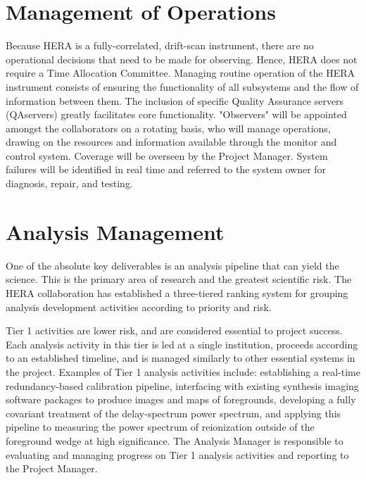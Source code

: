\documentclass[preprint]{aastex}
\begin{document}
\section{Management of Operations}
\label{sec:operations}

Because HERA is a fully-correlated, drift-scan instrument, there are no operational
decisions that need to be made for observing. Hence, HERA does not require a Time
Allocation Committee. Managing routine operation of the HERA instrument consists of
ensuring the functionality of all subsystems and the flow of information between
them. The inclusion of specific Quality Assurance servers (QAservers) greatly
facilitates core functionality. "Observers" will be appointed amongst the
collaborators on a rotating basis, who will manage operations, drawing on the
resources and information available through the monitor and control system. Coverage
will be overseen by the Project Manager. System failures will be identified in real
time and referred to the system owner for diagnosis, repair, and testing.


\section{Analysis Management}
\label{sec:analysis}

One of the absolute key deliverables is an analysis pipeline that can yield the science.  This is the primary area of
research and the greatest scientific risk.  The HERA collaboration has established
a three-tiered ranking system for grouping analysis development activities according to priority and risk.

Tier 1 activities are lower risk, and are considered essential to project success.  Each analysis activity
in this tier is led at a single institution, proceeds according to an established timeline, and is managed
similarly to other essential systems in the project.  Examples of Tier 1 analysis activities include:
establishing a real-time redundancy-based calibration pipeline, interfacing with existing synthesis imaging
software packages to produce images and maps of foregrounds, developing a fully covariant treatment of
the delay-spectrum power spectrum, and applying this pipeline to measuring the power spectrum of reionization
outside of the foreground wedge at high significance.
The Analysis Manager is responsible to evaluating
and managing progress on Tier 1 analysis activities and reporting to the Project Manager.
\end{document}
